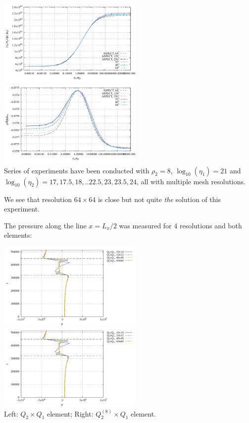\begin{center}
\includegraphics[width=7cm]{python_codes/fieldstone_53/results/reduced/results_v.pdf}
\includegraphics[width=7cm]{python_codes/fieldstone_53/results/reduced/results_p.pdf}\\
{\captionfont
Series of experiments have been conducted with $\rho_2=8$, 
$\log_{10}(\eta_1)=21$ and $\log_{10}(\eta_2)=17,17.5,18,..22.5,23,23.5,24$, 
all with multiple mesh resolutions.}
 \end{center}

We see that resolution $64\times 64$ is close but not quite {\sl the} solution of this experiment.

The pressure along the line $x=L_x/2$ was measured for 4 resolutions and both elements:
 
\begin{center}
\includegraphics[width=7cm]{python_codes/fieldstone_53/results/reduced/plines_q2q1.pdf}
\includegraphics[width=7cm]{python_codes/fieldstone_53/results/reduced/plines_ser.pdf}\\
{\captionfont Left: $Q_2\times Q_1$ element; Right: $Q_2^{(8)}\times Q_1$ element.}  
\end{center}

